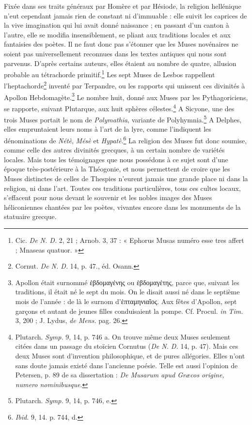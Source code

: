 \documentclass[landscape, a4paper, 11pt, oneside, polutonikogreek, french]{article}
\begin{document}
Fixée dans ses traits généraux par Homère et par Hésiode, la religion hellénique n'eut cependant jamais rien de constant ni d'immuable : elle suivit les caprices de la vive imagination qui lui avait donné naissance ; en passant d'un canton à l'autre, elle se modifia insensiblement, se pliant aux traditions locales et aux fantaisies des poètes. Il ne faut donc pas s'étonner que les Muses novénaires ne soient pas universellement reconnues dans les textes antiques qui nous sont parvenus. D'après certains auteurs, elles étaient au nombre de quatre, allusion probable au tétrachorde primitif.\footnote{Cic. \emph{De N. D.} 2, 21 ; Arnob. 3, 37 : « Ephorus Musas numéro esse tres affert ; Mnaseas quatuor. »} Les sept Muses de Lesbos rappellent l'heptachorde\footnote{Cornut. \emph{De N. D.} 14, p. 47., éd. Osann.} inventé par Terpandre, ou les rapports qui unissent ces divinités à Apollon Hebdomagète.\footnote{Apollon était surnommé ἑβδομαγἐνης ou ἑβδομαγέτης, parce que, suivant les traditions, il était né le sept du mois. On le disait aussi né dans le septième mois de l'année : de là le surnom d'ἑπταμηνιαῖος. Aux fêtes d'Apollon, sept garçons et autant de jeunes filles conduisaient la pompe. Cf. Procul. \emph{in Tim.} 3, 200 ; J. Lydus, \emph{de Mens.} pag. 26.} Le nombre huit, donné aux Muses par les Pythagoriciens, se rapporte, suivant Plutarque, aux huit sphères célestes.\footnote{Plutarch. \emph{Symp.} 9, 14, p. 746 a. On trouve même deux Muses seulement citées dans un passage du stoïcien Cornutus (\emph{De N. D.} 14, p. 47). Mais ces deux Muses sont d'invention philosophique, et de pures allégories. Elles n'ont sans doute jamais existé dans l'ancienne poésie. Telle est aussi l'opinion de Petersen, p. 89 de sa dissertation : \emph{De Musarum apud Græcos origine, numero nominibusque}.} A Sicyone, une des trois Muses portait le nom de \emph{Polymathia}, variante de Polyhymnia.\footnote{Plutarch. \emph{Symp.} 9, 14, p. 746, e.} A Delphes, elles empruntaient leurs noms à l'art de la lyre, comme l'indiquent les dénominations de \emph{Nétè}, \emph{Mésè} et \emph{Hypatè}.\footnote{\emph{Ibid.} 9, 14. p. 744, d.} La religion des Muses fut donc soumise, comme celle des autres divinités grecques, à un certain nombre de variétés locales. Mais tous les témoignages que nous possédons à ce sujet sont d'une époque très-postérieure à la Théogonie, et nous permettent de croire que les Muses distinctes de celles de Thespies n'eurent jamais une grande place ni dans la religion, ni dans l'art. Toutes ces traditions particulières, tous ces cultes locaux, s'effacent pour nous devant le souvenir et les nobles images des Muses héliconiennes chantées par les poètes, vivantes encore dans les monuments de la statuaire grecque.
\clearpage
\end{document}
